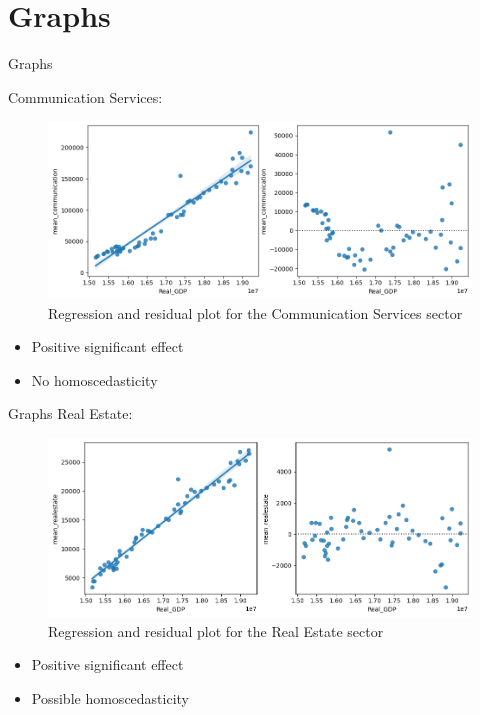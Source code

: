 \documentclass[11pt]{beamer}
\begin{document}
\section{Graphs}
\begin{frame}{Graphs}

Communication Services:
  \begin{figure}
    \includegraphics[width=1\textwidth]{imagens/Communication_Services.png}
    \caption{Regression and residual plot for the Communication Services sector}
    \label{something}
  \end{figure}
  
\begin{itemize}
    \item Positive significant effect
    \item No homoscedasticity
\end{itemize}
\end{frame}


\begin{frame}{Graphs}
Real Estate:
  \begin{figure}
    \includegraphics[width=1\textwidth]{imagens/Real_Estate.png}
    \caption{Regression and residual plot for the Real Estate sector}
    \label{something}
  \end{figure}

\begin{itemize}
    \item Positive significant effect
    \item Possible homoscedasticity
\end{itemize}
\end{frame}
\end{document}
